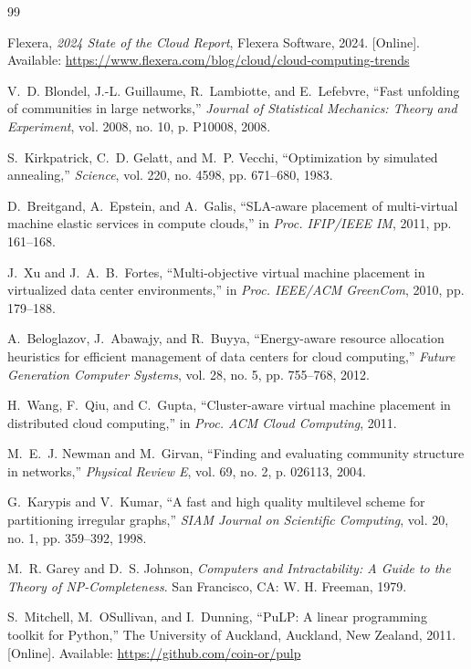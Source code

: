 \documentclass[10pt,journal,compsoc]{IEEEtran}
\begin{document}

\begin{thebibliography}{99}

Flexera, \textit{2024 State of the Cloud Report},
Flexera Software, 2024.
[Online]. Available: \url{https://www.flexera.com/blog/cloud/cloud-computing-trends}

V.~D. Blondel, J.-L. Guillaume, R.~Lambiotte, and E.~Lefebvre,
``Fast unfolding of communities in large networks,''
\textit{Journal of Statistical Mechanics: Theory and Experiment},
vol. 2008, no. 10, p. P10008, 2008.

S.~Kirkpatrick, C.~D. Gelatt, and M.~P. Vecchi,
``Optimization by simulated annealing,''
\textit{Science}, vol. 220, no. 4598, pp. 671--680, 1983.

D.~Breitgand, A.~Epstein, and A.~Galis,
``SLA-aware placement of multi-virtual machine elastic services in compute clouds,''
in \textit{Proc. IFIP/IEEE IM}, 2011, pp. 161--168.

J.~Xu and J.~A.~B.~Fortes,
``Multi-objective virtual machine placement in virtualized data center environments,''
in \textit{Proc. IEEE/ACM GreenCom}, 2010, pp. 179--188.

A.~Beloglazov, J.~Abawajy, and R.~Buyya,
``Energy-aware resource allocation heuristics for efficient management of data centers
for cloud computing,''
\textit{Future Generation Computer Systems}, vol. 28, no. 5, pp. 755--768, 2012.

H.~Wang, F.~Qiu, and C.~Gupta,
``Cluster-aware virtual machine placement in distributed cloud computing,''
in \textit{Proc. ACM Cloud Computing}, 2011.

M.~E.~J. Newman and M.~Girvan,
``Finding and evaluating community structure in networks,''
\textit{Physical Review E}, vol. 69, no. 2, p. 026113, 2004.

G.~Karypis and V.~Kumar,
``A fast and high quality multilevel scheme for partitioning irregular graphs,''
\textit{SIAM Journal on Scientific Computing}, vol. 20, no. 1, pp. 359--392, 1998.

M.~R. Garey and D.~S. Johnson,
\textit{Computers and Intractability: A Guide to the Theory of NP-Completeness}.
San Francisco, CA: W. H. Freeman, 1979.

S.~Mitchell, M.~OSullivan, and I.~Dunning,
``PuLP: A linear programming toolkit for Python,''
The University of Auckland, Auckland, New Zealand, 2011.
[Online]. Available: \url{https://github.com/coin-or/pulp}


\end{thebibliography}
\end{document}
